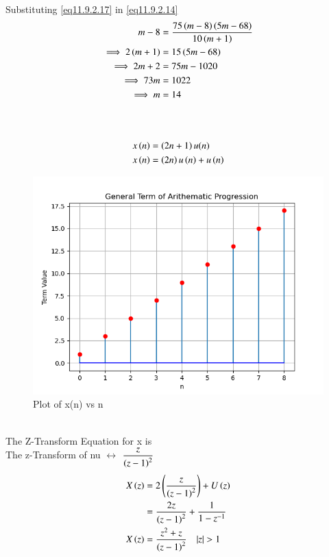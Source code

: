 \documentclass[journal,12pt,onecolumn]{IEEEtran}
\theoremstyle{remark}
\begin{document}
Substituting \eqref{eq11.9.2.17} in \eqref{eq11.9.2.14}\\
 \begin{align}
    m-8&=\frac{75\left(m-8\right)\left(5m-68\right)}{10\left(m+1\right)}\\
    \implies2\left(m+1\right)&=15\left(5m-68\right)\\
    \implies2m+2&=75m-1020\\
    \implies73m&=1022\\
    \implies m&=14
 \end{align}\\
  \\
\begin{align}
    x\left(n\right)&=\left(2n+1\right)u(n)\\
    x\left(n\right)&=\left(2n\right)u\left(n\right)+u\left(n\right)
\end{align}
\begin{figure}
    \centering
    \includegraphics[width=1.0\linewidth]{test.png}
    \caption{Plot of x(n) vs n}
    \label{fig:1}
\end{figure}\\
The Z-Transform Equation for x is\\
The z-Transform of nu $\leftrightarrow$ $\dfrac{z}{\left(z-1\right)^{2}}$\\
\begin{align}
    X\brak{z}&=2\brak{\dfrac{z}{\brak{z-1}^{2}}}+U\brak{z}\\
    &=\dfrac{2z}{\brak{z-1}^{2}}+\dfrac{1}{1-z^{-1}}\\
    X\brak{z}&=\dfrac{z^2+z}{\brak{z-1}^{2}} \quad{|z|>1}
\end{align}
\end{document}
